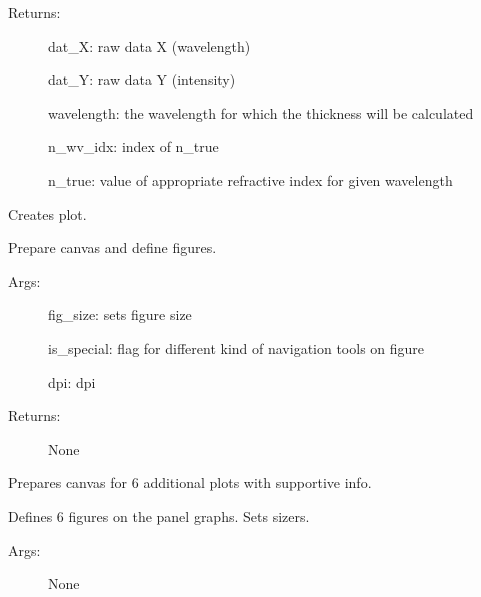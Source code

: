 \documentclass[letterpaper,10pt,english]{sphinxmanual}
\begin{document}
\begin{fulllineitems}
\begin{fulllineitems}
\begin{description}
\item[{Returns:}] \leavevmode
dat\_X: raw data X (wavelength)

dat\_Y: raw data Y (intensity)

wavelength: the wavelength for which the thickness will be calculated

n\_wv\_idx: index of n\_true

n\_true: value of appropriate refractive index for given wavelength

\end{description}

\end{fulllineitems}


\begin{fulllineitems}
\label{\detokenize{GUI:GUI.MyPanel.draw_graph}}
Creates plot.

Prepare canvas and define figures.
\begin{description}
\item[{Args:}] \leavevmode
fig\_size: sets figure size

is\_special: flag for different kind of navigation tools on figure

dpi: dpi

\item[{Returns:}] \leavevmode
None

\end{description}

\end{fulllineitems}


\begin{fulllineitems}
\label{\detokenize{GUI:GUI.MyPanel.draw_graphs}}
Prepares canvas for 6 additional plots with supportive info.

Defines 6 figures on the panel graphs. Sets sizers.
\begin{description}
\item[{Args:}] \leavevmode
None


\end{description}
\end{fulllineitems}
\end{fulllineitems}
\end{document}
